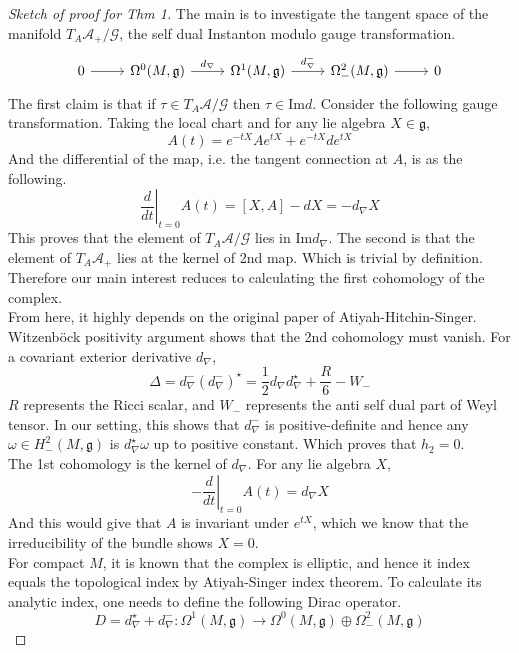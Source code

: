 \documentclass{article}
\begin{document}
\begin{proof}[Sketch of proof for Thm 1]
    The main is to investigate the tangent space of the manifold $T_A \mathscr{A}_{+}/\mathscr{G}$, the self dual Instanton modulo gauge transformation.
    \[
    \begin{tikzcd}
        0 \arrow[r] & \Omega^0(M, \mathfrak{g}) \arrow[r, "d_\nabla"] & \Omega^1(M, \mathfrak{g}) \arrow[r,"d_\nabla^{-}"] & \Omega^2_{-}(M, \mathfrak{g}) \arrow[r] &  0
    \end{tikzcd}
    \]
    The first claim is that if $\tau \in T_A\mathscr{A}/\mathscr{G}$ then $\tau\in\mathrm{Im}d$. Consider the following gauge transformation. Taking the local chart and for any lie algebra $X\in\mathfrak{g}$, 
    \[
        A(t) = e^{-tX}A e^{tX} + e^{-tX}d e^{tX}
    \]
    And the differential of the map, i.e. the tangent connection at $A$, is as the following.
    \[
        \left.\frac{d}{dt}\right|_{t=0}A(t)= [X,A] - dX = -d_\nabla X
    \]
    This proves that the element of $T_A\mathscr{A}/\mathscr{G}$ lies in $\mathrm{Im}d_\nabla$. The second is that the element of $T_A\mathscr{A}_+$ lies at the kernel of 2nd map. Which is trivial by definition. Therefore our main interest reduces to calculating the first cohomology of the complex. \\
    From here, it highly depends on the original paper of Atiyah-Hitchin-Singer. Witzenböck positivity argument shows that the 2nd cohomology must vanish. 
        For a covariant exterior derivative $d_\nabla$, 
        \[
            \Delta= d_\nabla^{-} (d_\nabla^{-})^\star = \frac{1}{2}d_\nabla d_\nabla^\star + \frac{R}{6} - W_-
        \]
        $R$ represents the Ricci scalar, and $W_-$ represents the anti self dual part of Weyl tensor.
    In our setting, this shows that $d_\nabla^-$ is positive-definite and hence any $\omega\in H^2_-(M,\mathfrak{g})$ is $d_\nabla^\star\omega$ up to positive constant. Which proves that $h_2=0$.\\
    The 1st cohomology is the kernel of $d_\nabla$. For any lie algebra $X$,
    \[
        -\left.\frac{d}{dt}\right|_{t=0}A(t)= d_\nabla X
    \]
    And this would give that $A$ is invariant under $e^{tX}$, which we know that the irreducibility of the bundle shows $X=0$. 
    \\
    For compact $M$, it is known that the complex is elliptic, and hence it index equals the topological index by Atiyah-Singer index theorem. To calculate its analytic index, one needs to define the following Dirac operator.
    \[
       D = d_\nabla^{\star} + d_\nabla^{-}:\Omega^1(M,\mathfrak{g})\rightarrow \Omega^0(M,\mathfrak{g})\oplus\Omega^2_{-}(M,\mathfrak{g})
\]
\end{proof}
\end{document}
